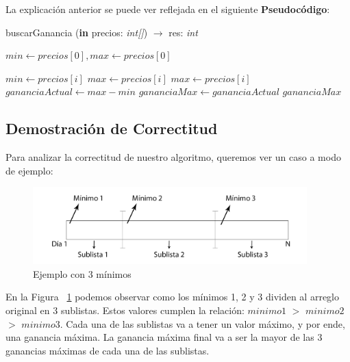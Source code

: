 \indent La explicación anterior se puede ver reflejada en el siguiente
\textbf{Pseudocódigo}:

\begin{algorithm}
\caption{buscarGanancia (\textbf{in} precios: \textsl{int[]}) $\rightarrow$ res:
\textsl{int}}
\begin{algorithmic}[1]
\STATE $min \leftarrow precios[0], max \leftarrow precios[0]$

		\STATE $min \leftarrow precios[i]$
		\STATE $max \leftarrow precios[i]$
	\ENDIF
		\STATE $max \leftarrow precios[i]$
	\ENDIF	
	\STATE $gananciaActual \leftarrow max - min$
		\STATE $gananciaMax \leftarrow gananciaActual$
	\ENDIF
\ENDFOR
\RETURN $gananciaMax$
\end{algorithmic}
\end{algorithm}

\clearpage

\subsection{Demostración de Correctitud}
\indent Para analizar la correctitud de nuestro algoritmo, queremos ver un caso
a modo de ejemplo:

\begin{figure}[h]
\centering                                                       
        \includegraphics[width=300pt]{./figs/sublistas.png}
	\caption{Ejemplo con 3 mínimos}
	\label{fig:sublistas}
\end{figure}

\indent En la Figura ~\ref{fig:sublistas} podemos observar como los mínimos 1, 2
y 3 dividen al
arreglo original en 3 sublistas. Estos valores cumplen la relación:
$minimo 1$ $>$ $minimo 2$ $>$ $minimo3$. Cada una de las sublistas va a tener un
valor máximo, y por ende, una ganancia máxima. La ganancia máxima final va a ser
la mayor de las 3 ganancias máximas de cada una de las sublistas.\\

